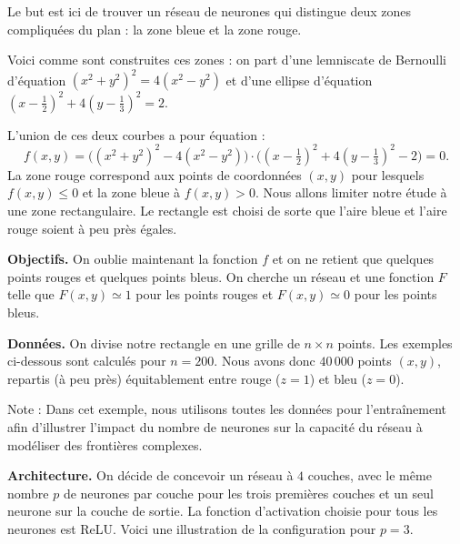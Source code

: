 Le but est ici de trouver un réseau de neurones qui distingue deux zones compliquées du plan : la zone bleue et la zone rouge.




Voici comme sont construites ces zones : on part d'une lemniscate de Bernoulli d'équation $(x^2+y^2)^2 = 4(x^2-y^2)$ et d'une ellipse d'équation
$(x-\frac12)^2 + 4(y-\frac13)^2=2$. 

\begin{center}
	\begin{minipage}{0.31\textwidth}
	\end{minipage}
	\quad
	\begin{minipage}{0.31\textwidth}
		
	\end{minipage}
	\quad
	\begin{minipage}{0.31\textwidth}
	\end{minipage}
\end{center}


L'union de ces deux courbes a pour équation :
$$f(x,y) = \big( (x^2+y^2)^2 - 4(x^2-y^2) \big)  \cdot \big((x-\tfrac12)^2 + 4(y-\tfrac13)^2 - 2 \big) = 0.$$
La zone rouge correspond aux points de coordonnées $(x,y)$ pour lesquels $f(x,y) \le 0$ et la zone bleue à $f(x,y) > 0$. Nous allons limiter notre étude à une zone rectangulaire. Le rectangle est choisi de sorte que l'aire bleue et l'aire rouge soient à peu près égales.

\textbf{Objectifs.} 
On oublie maintenant la fonction $f$ et on ne retient que quelques points rouges et quelques points bleus. On cherche un réseau et une fonction $F$ telle que $F(x,y) \simeq 1$ pour les points rouges et $F(x,y) \simeq 0$ pour les points bleus.

\textbf{Données.} 
On divise notre rectangle en une grille de $n \times n$ points. Les exemples ci-dessous sont calculés pour $n=200$. Nous avons donc $40\,000$ points $(x,y)$, repartis (à peu près) équitablement entre rouge ($z=1$) et bleu ($z=0$).

Note : Dans cet exemple, nous utilisons toutes les données pour l'entraînement afin d'illustrer l'impact du nombre de neurones sur la capacité du réseau à modéliser des frontières complexes.

\textbf{Architecture.}
On décide de concevoir un réseau à $4$ couches, avec le même nombre $p$ de neurones par couche pour les trois premières couches et un seul neurone sur la couche de sortie. La fonction d'activation choisie pour tous les neurones est ReLU.
Voici une illustration de la configuration pour $p=3$.

